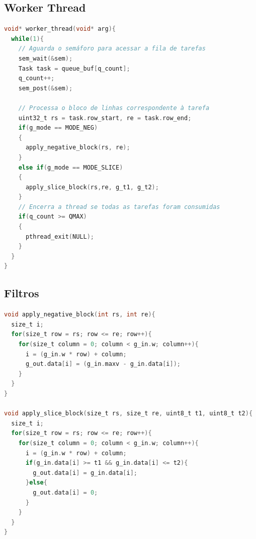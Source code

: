 \documentclass[12 pt]{abntex2}
\begin{document}
\subsection{Worker Thread}

\begin{lstlisting}[language=C, texcl=true]
void* worker_thread(void* arg){
  while(1){
    // Aguarda o semáforo para acessar a fila de tarefas
    sem_wait(&sem);
    Task task = queue_buf[q_count];
    q_count++;
    sem_post(&sem);

    // Processa o bloco de linhas correspondente à tarefa
    uint32_t rs = task.row_start, re = task.row_end;
    if(g_mode == MODE_NEG)
    {
      apply_negative_block(rs, re);
    }
    else if(g_mode == MODE_SLICE)
    {
      apply_slice_block(rs,re, g_t1, g_t2);
    }
    // Encerra a thread se todas as tarefas foram consumidas
    if(q_count >= QMAX)
    {
      pthread_exit(NULL); 
    }
  } 
}
\end{lstlisting}

\subsection{Filtros}
 
\begin{lstlisting}[language=C, texcl=true]
void apply_negative_block(int rs, int re){
  size_t i;
  for(size_t row = rs; row <= re; row++){
    for(size_t column = 0; column < g_in.w; column++){
      i = (g_in.w * row) + column;
      g_out.data[i] = (g_in.maxv - g_in.data[i]);
    }
  }
}

void apply_slice_block(size_t rs, size_t re, uint8_t t1, uint8_t t2){
  size_t i;
  for(size_t row = rs; row <= re; row++){
    for(size_t column = 0; column < g_in.w; column++){
      i = (g_in.w * row) + column;
      if(g_in.data[i] >= t1 && g_in.data[i] <= t2){
        g_out.data[i] = g_in.data[i];
      }else{
        g_out.data[i] = 0;
      }
    }
  }
}
\end{lstlisting}



\end{document}
